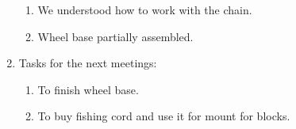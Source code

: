 \begin{enumerate}
\begin{enumerate}
		\item We understood how to work with the chain.
		
		\item Wheel base partially assembled.
		
	\end{enumerate}
	
	\item Tasks for the next meetings:
	\begin{enumerate}
		
		\item To finish wheel base.
		
		\item To buy fishing cord and use it for mount for blocks.
		
	\end{enumerate}
\end{enumerate}
\fillpage
